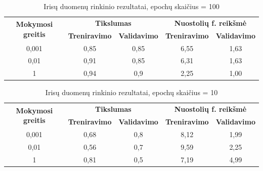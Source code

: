 \documentclass{VUMIFPSbakalaurinis}
\begin{document}
\begin{table}[]
  \centering
  \caption{Irisų duomenų rinkinio rezultatai, epochų skaičius = 100}{
  \begin{tabular}{|c|cc|cc|}
  \hline
  \multirow{2}{*}{\textbf{Mokymosi greitis}} & \multicolumn{2}{c|}{\textbf{Tikslumas}}                         & \multicolumn{2}{c|}{\textbf{Nuostolių f. reikšmė}}              \\ \cline{2-5} 
                                             & \multicolumn{1}{c|}{\textbf{Treniravimo}} & \textbf{Validavimo} & \multicolumn{1}{c|}{\textbf{Treniravimo}} & \textbf{Validavimo} \\ \hline
  0,001                                      & \multicolumn{1}{c|}{0,85}                 & 0,85                & \multicolumn{1}{c|}{6,55}                 & 1,63                \\ \hline
  0,01                                       & \multicolumn{1}{c|}{0,91}                 & 0,85                & \multicolumn{1}{c|}{6,31}                 & 1,63                \\ \hline
  1                                          & \multicolumn{1}{c|}{0,94}                 & 0,9                 & \multicolumn{1}{c|}{2,25}                 & 1,00                \\ \hline
  \end{tabular}}
  \label{tab:e-100-iris-sig}
  \end{table}


\begin{table}[]
  \centering
  \caption{Irisų duomenų rinkinio rezultatai, epochų skaičius = 10}{
  \begin{tabular}{|c|cc|cc|}
  \hline
  \multirow{2}{*}{\textbf{Mokymosi greitis}} & \multicolumn{2}{c|}{\textbf{Tikslumas}}                         & \multicolumn{2}{c|}{\textbf{Nuostolių f. reikšmė}}              \\ \cline{2-5} 
                                             & \multicolumn{1}{c|}{\textbf{Treniravimo}} & \textbf{Validavimo} & \multicolumn{1}{c|}{\textbf{Treniravimo}} & \textbf{Validavimo} \\ \hline
  0,001                                      & \multicolumn{1}{c|}{0,68}                 & 0,8                 & \multicolumn{1}{c|}{8,12}                 & 1,99                \\ \hline
  0,01                                       & \multicolumn{1}{c|}{0,56}                 & 0,7                 & \multicolumn{1}{c|}{9,59}                 & 2,25                \\ \hline
  1                                          & \multicolumn{1}{c|}{0,81}                 & 0,5                 & \multicolumn{1}{c|}{7,19}                 & 4,99                \\ \hline
  \end{tabular}}
  \label{tab:e-10-iris-sig}
  \end{table}
\end{document}

